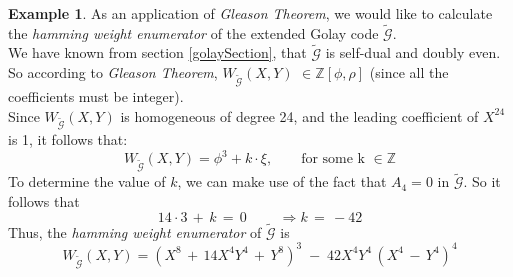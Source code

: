 \documentclass[12pt]{article}
\theoremstyle{definition}
\newtheorem{example}[theorem]{Example}
\numberwithin{equation}{theorem}
\numberwithin{figure}{theorem}
\newcommand{\cCodes}{\ensuremath{\widetilde{\mathcal{G}}}}
\newcommand{\weightEnumerator}[3]{\ensuremath{W_{#1}(#2,#3)}}
\newcommand{\Integer}{\ensuremath{\mathbb{Z}}}
\begin{document}
\begin{example}\label{golayEnumerExample}
As an application of \emph{Gleason Theorem}, we would like to calculate the \emph{hamming weight enumerator} of the extended Golay code {\cCodes}.\\
We have known from section \ref{golaySection}, that {\cCodes} is self-dual and doubly even. So according to \emph{Gleason Theorem}, {\weightEnumerator{\cCodes}{X}{Y}} $\in \Integer[\phi,\rho]$ (since all the coefficients must be integer).\\
Since {\weightEnumerator{\cCodes}{X}{Y}} is homogeneous of degree 24, and the leading coefficient of $X^24$ is 1, it follows that:
\[
	\weightEnumerator{\cCodes}{X}{Y} = \phi^3 + k \cdot \xi, \quad \quad \mbox{for some k $\in \Integer$}
\]
To determine the value of $k$, we can make use of the fact that $A_4 = 0$ in $\cCodes$. So it follows that 
\[
	14 \cdot 3 \,+\, k \, =\, 0 \qquad \; \Rightarrow k \,=\, -42
\]
Thus, the \emph{hamming weight enumerator} of {\cCodes} is 
\[
	\weightEnumerator{\cCodes}{X}{Y} = (X^8 \,+ \, 14X^4 Y^4 \,+\, Y^8) ^3 \; - \; 42 X^4Y^4 \,(X^4 \, - \, Y^4)^4
\]
\end{example}
\end{document}
